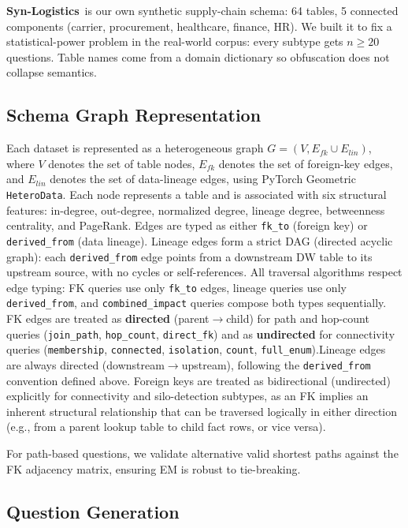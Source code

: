 \textbf{Syn-Logistics}~is our own synthetic supply-chain schema: 64
tables, 5 connected components (carrier, procurement, healthcare, finance,
HR).  We built it to fix a statistical-power problem in the real-world
corpus: every subtype gets $n \geq 20$ questions.  Table names come from
a domain dictionary so obfuscation does not collapse semantics.

\subsection{Schema Graph Representation}

Each dataset is represented as a heterogeneous graph $G = (V, E_{fk} \cup
E_{lin})$, where $V$ denotes the set of table nodes, $E_{fk}$ denotes the
set of foreign-key edges, and $E_{lin}$ denotes the set of data-lineage
edges, using PyTorch Geometric~\cite{fey2019pyg}
\texttt{HeteroData}. Each node represents a table and is associated with six structural features: in-degree, out-degree, normalized
degree, lineage degree, betweenness centrality, and PageRank. Edges are
typed as either \texttt{fk\_to} (foreign key) or \texttt{derived\_from}
(data lineage). Lineage edges form a strict DAG (directed acyclic graph):
each \texttt{derived\_from} edge points from a downstream DW table to its
upstream source, with no cycles or self-references. All traversal
algorithms respect edge typing: FK queries use only \texttt{fk\_to}
edges, lineage queries use only \texttt{derived\_from}, and
\texttt{combined\_impact} queries compose both types sequentially.
FK edges are treated as \textbf{directed} (parent$\to$child) for
path and hop-count queries (\texttt{join\_path}, \texttt{hop\_count},
\texttt{direct\_fk}) and as \textbf{undirected} for connectivity
queries (\texttt{membership}, \texttt{connected}, \texttt{isolation},
\texttt{count}, \texttt{full\_enum}).Lineage edges are always directed (downstream$\to$upstream),
following the \texttt{derived\_from} convention defined above.
Foreign keys are treated as bidirectional (undirected) explicitly for
connectivity and silo-detection subtypes, as an FK implies an inherent
structural relationship that can be traversed logically in either direction
(e.g., from a parent lookup table to child fact rows, or vice versa).

For path-based questions, we validate alternative valid shortest paths
against the FK adjacency matrix, ensuring EM is robust to tie-breaking.

\subsection{Question Generation}
\label{sec:qa-generation}

